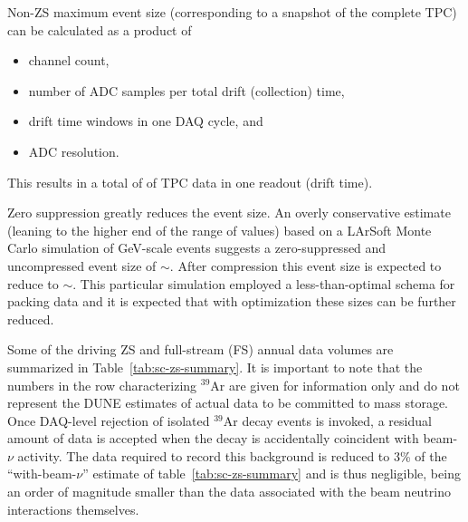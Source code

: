 Non-ZS maximum event size (corresponding to a snapshot of the complete
TPC) can be calculated as a product of %
\begin{itemize}
\item channel count,
\item number of ADC samples per total drift (collection) time,
\item drift time windows in one DAQ cycle, and
\item ADC resolution.
\end{itemize}

This results in a total of \dunefsreadoutsize %
of TPC data in one readout (drift time). 

Zero suppression greatly reduces the event size.  An overly
conservative estimate (leaning to the higher end of the range of
values) based on a LArSoft Monte Carlo simulation of GeV-scale events
suggests a zero-suppressed and uncompressed event size of
$\sim$\beameventsize.  After compression this event size is expected
to reduce to $\sim$\beameventsizecompressed.  This particular simulation
employed a less-than-optimal  schema for packing data and it is
expected that with optimization these sizes can be further reduced.

Some of the driving ZS and full-stream (FS) annual
data volumes are summarized in Table~\ref{tab:sc-zs-summary}. It is
important to note that the numbers in the row characterizing $^{39}$Ar
are given for information only and do not represent the DUNE estimates of
actual data to be committed to mass storage.
Once DAQ-level rejection of isolated $^{39}$Ar decay events is invoked,
a residual amount of data is accepted when the decay is accidentally
coincident with beam-$\nu$ activity.
The data required to record this background is reduced to 3\% of the
``with-beam-$\nu$'' estimate of table~\ref{tab:sc-zs-summary} and is
thus negligible, being an order of magnitude smaller than the data
associated with the beam neutrino interactions themselves.

